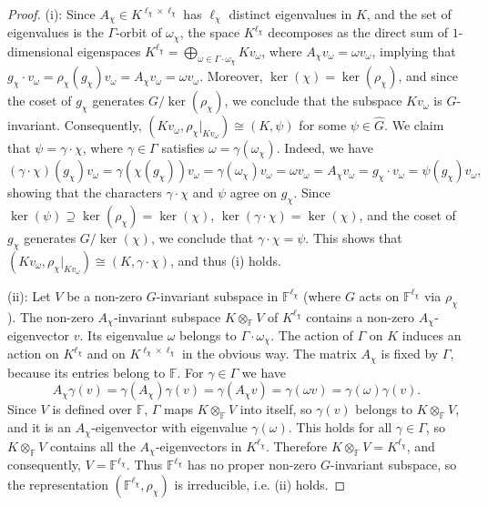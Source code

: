 \documentclass[12pt, oneside]{amsart}
\def\field{K}
\def\FF{\mathbb{F}}
\begin{document}
\begin{proof} 
(i): Since $A_\chi\in \field^{\ell_\chi\times\ell_\chi}$ has $\ell_\chi$ distinct eigenvalues in $\field$, and the set of eigenvalues 
is the $\Gamma$-orbit of $\omega_\chi$, the space $\field^{\ell_\chi}$ decomposes as the direct sum of $1$-dimensional eigenspaces 
$\field^{\ell_\chi}=\bigoplus_{\omega\in \Gamma\cdot \omega_\chi}\field v_\omega$, 
where $A_\chi v_\omega=\omega v_\omega$, implying that 
$g_\chi \cdot v_\omega =\rho_\chi(g_\chi)v_\omega=A_\chi v_\omega=\omega v_\omega$.  
Moreover, $\ker(\chi)=\ker(\rho_\chi)$, and since the coset of $g_{\chi}$ generates $G/\ker(\rho_\chi)$, 
we conclude that the subspace $\field v_\omega$ is $G$-invariant. 
Consequently, $(\field v_\omega,\rho_\chi\vert_{\field v_\omega})\cong (\field,\psi)$ for some 
$\psi\in \widehat G$. We claim that $\psi=\gamma\cdot \chi$, where $\gamma\in \Gamma$ satisfies 
$\omega=\gamma(\omega_\chi)$. 
Indeed, we have 
\[(\gamma\cdot\chi)(g_\chi)v_\omega=\gamma(\chi(g_\chi))v_\omega
=\gamma(\omega_\chi)v_\omega
=\omega v_\omega=A_\chi v_\omega=g_\chi\cdot v_\omega=\psi(g_\chi)v_\omega,\] 
showing that the characters $\gamma\cdot \chi$ and $\psi$ agree on $g_\chi$. 
Since  $\ker(\psi)\supseteq \ker(\rho_\chi)=\ker(\chi)$,  
$\ker(\gamma\cdot \chi)=\ker(\chi)$, and the coset of $g_\chi$ generates $G/\ker(\chi)$, 
we conclude that $\gamma\cdot \chi=\psi$.  
This shows that $(\field v_\omega,\rho_\chi\vert_{\field v_\omega})\cong (\field,\gamma\cdot\chi)$, 
and thus (i) holds. 

  
(ii):  Let $V$ be a non-zero $G$-invariant subspace in $\FF^{\ell_\chi}$ (where $G$ acts on $\FF^{\ell_\chi}$ via $\rho_\chi$). 
The non-zero $A_\chi$-invariant subspace $\field\otimes_\FF V$  of $\field^{\ell_\chi}$ 
contains a non-zero $A_\chi$-eigenvector $v$. Its  
eigenvalue $\omega$ belongs to $\Gamma\cdot \omega_\chi$. 
The action of $\Gamma$ on $\field$ induces an action on 
$\field^{\ell_\chi}$ and on $\field^{\ell_\chi\times \ell_\chi}$ in the obvious way. The matrix $A_\chi$ is fixed by $\Gamma$, because its entries 
belong to $\FF$. For $\gamma\in\Gamma$ we have 
\begin{equation}\label{eq:gamma v}
A_\chi\gamma(v)=\gamma(A_\chi)\gamma(v)=
\gamma(A_\chi v)=
\gamma(\omega v)=\gamma(\omega)\gamma(v). 
\end{equation}   
Since $V$ is defined over $\FF$, 
$\Gamma$ maps $\field\otimes_\FF V$ into itself, so $\gamma(v)$ belongs to 
$\field\otimes_\FF V$, and it is an $A_\chi$-eigenvector with eigenvalue $\gamma(\omega)$. 
This holds for all $\gamma\in \Gamma$, so $\field\otimes_\FF V$ contains all the $A_\chi$-eigenvectors in 
$\field^{\ell_\chi}$.  
Therefore 
$\field\otimes_\FF V=\field^{\ell_\chi}$, and consequently, $V=\FF^{\ell_\chi}$.   
Thus $\FF^{\ell_\chi}$ has no proper non-zero $G$-invariant subspace, 
so the representation $(\FF^{\ell_\chi},\rho_\chi)$ is irreducible, i.e. (ii) holds. 


\end{proof}
\end{document}
